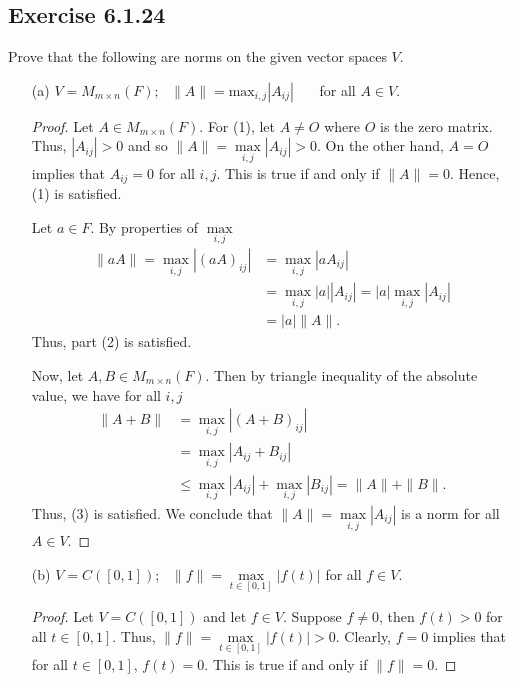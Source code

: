 \subsection*{Exercise 6.1.24} Prove that the following are norms on the given vector spaces \( V  \).
\begin{enumerate}
    \item[(a)] \( V = {M}_{m \times n}(F); \ \ \ \|A \| = \text{max}_{i,j} | {A}_{ij} |    \) \ \ \  for all \( A \in V  \).
        \begin{proof}
            Let \( A \in {M}_{m \times n }(F) \). For (1), let \( A \neq O  \) where \( O  \) is the zero matrix. Thus, \( | {A}_{ij} |  > 0  \) and so \( \|A \| = \max\limits_{i,j} | {A}_{ij} | > 0   \). On the other hand, \( A = O \) implies that \( {A}_{ij} = 0  \) for all \( i,j  \). This is true if and only if \( \|A \| = 0   \). Hence, (1) is satisfied.


            Let \( a \in F  \). By properties of \( \max\limits_{i,j}  \)
            \begin{align*}
                \|a A \| = \max\limits_{i,j} | (aA)_{ij} | &= \max\limits_{i,j} | a {A}_{ij} | \\ 
                                                           &= \max\limits_{i,j} | a | | {A}_{ij} | = | a | \max\limits_{i,j} | {A}_{ij} |  \\   
                                                           &= | a | \|A\|.
        \end{align*}
        Thus, part (2) is satisfied.

        Now, let \( A, B \in {M}_{m \times n}(F) \). Then by triangle inequality of the absolute value, we have for all \( i,j \)
        \begin{align*}
            \|A + B\| &= \max\limits_{i,j} | {(A + B)}_{ij}  |  \\
                      &= \max\limits_{i,j} | {A}_{ij} + {B}_{ij} | \\
                      &\leq \max\limits_{i,j} | {A}_{ij} |  + \max\limits_{i,j} | {B}_{ij} | = \|A \| + \|B\|.
        \end{align*}
        Thus, (3) is satisfied. We conclude that \( \|A\| = \max\limits_{i,j} | {A}_{ij} |  \) is a norm for all \( A \in V  \).
        \end{proof}
    \item[(b)] \( V = C([0,1]);  \ \ \  \|f\| = \max\limits_{t \in [0,1]} | f(t) |  \) for all \( f \in V  \). 
        \begin{proof}
            Let \( V = C([0,1]) \) and let \( f \in V  \). Suppose \( f \neq 0  \), then \( f(t) > 0  \) for all \( t \in [0,1] \). Thus, \( \|f\| = \max\limits_{t \in [0,1]} | f(t) | > 0   \). Clearly, \( f = 0  \) implies that for all \( t \in [0,1]  \), \( f(t) = 0  \). This is true if and only if \( \|f\| = 0  \). 


\end{proof}
\end{enumerate}
